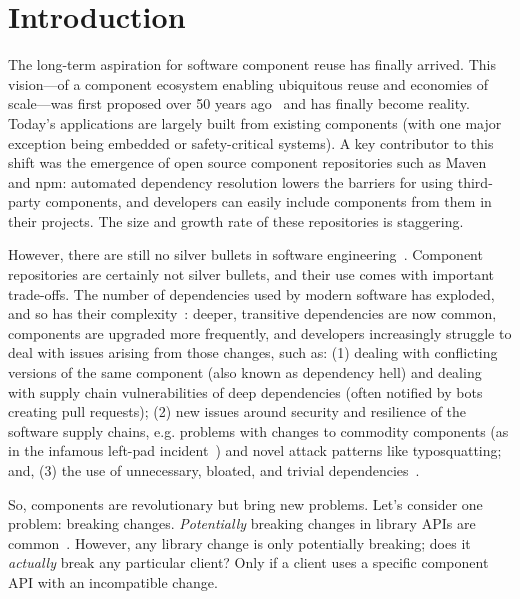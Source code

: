 \section{Introduction}
\label{sec:introduction}

The long-term aspiration for software component reuse has finally arrived. This vision---of a component ecosystem enabling ubiquitous reuse and economies of scale---was first proposed over 50 years ago~\cite{mcilroy1968mass} and has finally become reality. Today's applications are largely built from existing components (with one major exception being embedded or safety-critical systems). A key contributor to this shift was the emergence of open source component repositories  such as Maven and npm: automated dependency resolution lowers the barriers for using third-party components, and developers can easily include components from them in their projects. The size and growth rate of these repositories is staggering.

However, there are still no silver bullets in software engineering~\cite{frederick87:_no_silver_bullet}. Component repositories are certainly not silver bullets, and their use comes with important trade-offs. The number of dependencies used by modern software has exploded, and so has their complexity~\cite{kikas2017structure,benelallam2019maven}: deeper, transitive dependencies are now common, components are upgraded more frequently, and developers increasingly struggle to deal with issues arising from those changes, such as: (1) dealing with conflicting versions of the same component (also known as dependency hell) and dealing with supply chain vulnerabilities of deep dependencies (often notified by bots creating pull requests); (2) new issues around security and resilience of the software supply chains, e.g. problems with changes to commodity components (as in the infamous left-pad incident~\cite{collins16:_how}) and novel attack patterns like typosquatting; and, (3) the use of unnecessary, bloated, and trivial dependencies~\cite{abdalkareem2017developers,soto2021comprehensive}.

So, components are revolutionary but bring new problems. Let's consider one problem: breaking changes. \textit{Potentially} breaking changes in library APIs are common~\cite{dietrich2014broken,raemaekers2014semantic}. However, any library change is only potentially breaking; does it \textit{actually} break any particular client? Only if a client uses a specific component API with an incompatible change.  

